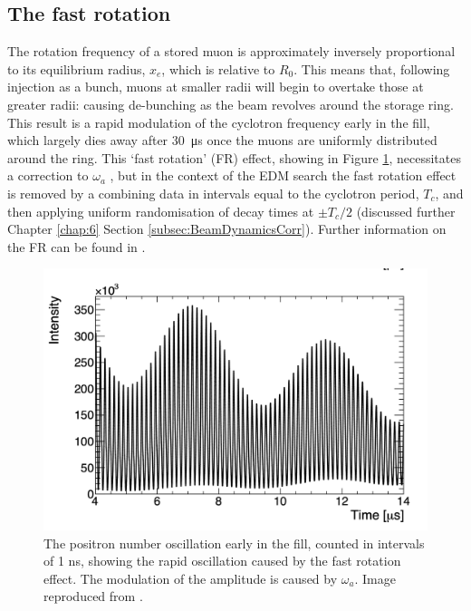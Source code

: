 \subsection{The fast rotation}\label{subsec:FR}

The rotation frequency of a stored muon is approximately inversely proportional to its equilibrium radius, $x_{e}$, which is relative to $R_{0}$. This means that, following injection as a bunch, muons at smaller radii will begin to overtake those at greater radii: causing de-bunching as the beam revolves around the storage ring. This result is a rapid modulation of the cyclotron frequency early in the fill, which largely dies away after \SI{30}{\micro\second} once the muons are uniformly distributed around the ring. This `fast rotation' (FR) effect, showing in Figure \ref{fig:FR}, necessitates a correction to $\omega_{a}$ \cite{OmegaARun1}, but in the context of the EDM search the fast rotation effect is removed by a combining data in intervals equal to the cyclotron period, $T_{c}$, and then applying uniform randomisation of decay times at $\pm T_{c}/2$ (discussed further Chapter \ref{chap:6} Section \ref{subsec:BeamDynamicsCorr}). Further information on the FR can be found in \cite[and references therein]{BeamDynamics}.

\begin{figure}[t!]
\centering{}
\includegraphics[trim={0 0 0 0},clip,width=.69\textwidth]{Images/Chapter3/FR.png}
\caption{The positron number oscillation early in the fill, counted in intervals of 1 ns, showing the rapid oscillation caused by the fast rotation effect. The modulation of the amplitude is caused by $\omega_{a}$. Image reproduced from \cite{BeamDynamics}.}
\label{fig:FR}
\end{figure} 

